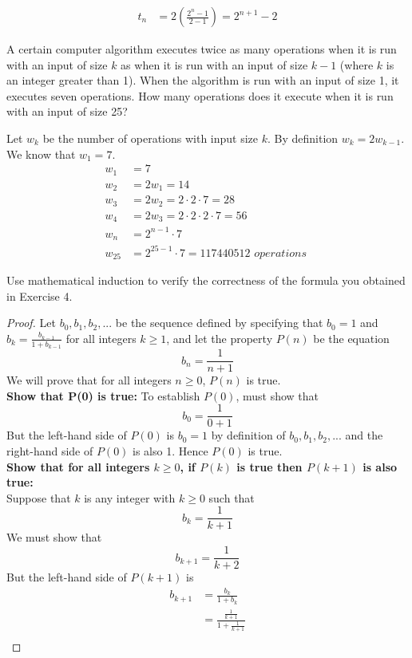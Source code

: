 \documentclass[12pt,letterpaper, onecolumn]{exam}
\begin{document}
\begin{questions}
\begin{solution}
\begin{align*}
		t_n&=2\left(\frac{2^n-1}{2-1}\right)=2^{n+1}-2
	\end{align*}
	\end{solution}
		\setcounter{question}{24}\question A certain computer algorithm executes twice as many operations when it is run with an input of size $k$ as when it is run with an input of size $k-1$ (where $k$ is an integer greater than 1). When the algorithm is run with an input of size 1, it executes seven operations. How many operations does it execute when it is run with an input of size 25?
		\begin{solution}
			Let $w_k$ be the number of operations with input size $k$. By definition $w_k=2w_{k-1}$. We know that $w_1=7$. 
			\begin{align*}
				w_{1}&=7\\
				w_{2}&=2w_{1}=14\\
				w_{3}&=2w_{2}=2\cdot2\cdot7=28\\
				w_{4}&=2w_{3}=2\cdot2\cdot2\cdot7=56\\
				w_{n}&=2^{n-1}\cdot7\\
				w_{25}&=2^{25-1}\cdot7=117440512 \textit{ operations }
			\end{align*}
		\end{solution}
	\setcounter{question}{28} \question Use mathematical induction to verify the correctness of the formula you obtained in Exercise 4.
	\begin{solution}
		\begin{proof}
		Let $b_0,b_1,b_2,...$ be the sequence defined by specifying that $b_0=1$ and $b_k=\frac{b_{k-1}}{1+b_{k-1}}$ for all integers $k\geq1$, and let the property $P(n)$ be the equation
		$$b_n=\frac{1}{n+1}$$
		We will prove that for all integers $n\geq0$, $P(n)$ is true.\\
		\textbf{Show that P(0) is true:} To establish $P(0)$, must show that 
		$$b_0=\frac{1}{0+1}$$
		But the left-hand side of $P(0)$ is $b_0=1$ by definition of  $b_0,b_1,b_2,...$ and the right-hand side of $P(0)$ is also 1. Hence $P(0)$ is true.\\
		\textbf{Show that for all integers $k\geq0$, if $P(k)$ is true then $P(k + 1)$ is also true:}\\
		Suppose that $k$ is any integer with $k\geq0$ such that
		$$b_k=\frac{1}{k+1}$$
		We must show that
		$$b_{k+1}=\frac{1}{k+2}$$
		But the left-hand side of $P(k+1)$ is
		\begin{align*}
			b_{k+1}&=\frac{b_k}{1+b_k}\\
			&=\frac{\frac{1}{k+1}}{1+\frac{1}{k+1}}\\

\end{align*}
\end{proof}
\end{solution}
\end{questions}
\end{document}
